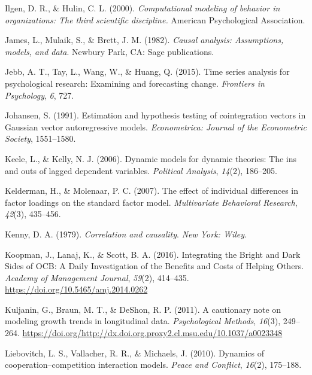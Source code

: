 \documentclass[english,,man]{apa6}
\begin{document}
\leavevmode\hypertarget{ref-ilgen_computational_2000}{}%
Ilgen, D. R., \& Hulin, C. L. (2000). \emph{Computational modeling of behavior in organizations: The third scientific discipline.} American Psychological Association.

\leavevmode\hypertarget{ref-james1982causal}{}%
James, L., Mulaik, S., \& Brett, J. M. (1982). \emph{Causal analysis: Assumptions, models, and data}. Newbury Park, CA: Sage publications.

\leavevmode\hypertarget{ref-jebb_time_2015}{}%
Jebb, A. T., Tay, L., Wang, W., \& Huang, Q. (2015). Time series analysis for psychological research: Examining and forecasting change. \emph{Frontiers in Psychology}, \emph{6}, 727.

\leavevmode\hypertarget{ref-johansen_estimation_1991}{}%
Johansen, S. (1991). Estimation and hypothesis testing of cointegration vectors in Gaussian vector autoregressive models. \emph{Econometrica: Journal of the Econometric Society}, 1551--1580.

\leavevmode\hypertarget{ref-keele_dynamic_2006}{}%
Keele, L., \& Kelly, N. J. (2006). Dynamic models for dynamic theories: The ins and outs of lagged dependent variables. \emph{Political Analysis}, \emph{14}(2), 186--205.

\leavevmode\hypertarget{ref-kelderman2007effect}{}%
Kelderman, H., \& Molenaar, P. C. (2007). The effect of individual differences in factor loadings on the standard factor model. \emph{Multivariate Behavioral Research}, \emph{42}(3), 435--456.

\leavevmode\hypertarget{ref-kenny1979correlation}{}%
Kenny, D. A. (1979). \emph{Correlation and causality}. \emph{New York: Wiley}.

\leavevmode\hypertarget{ref-koopman_integrating_2016}{}%
Koopman, J., Lanaj, K., \& Scott, B. A. (2016). Integrating the Bright and Dark Sides of OCB: A Daily Investigation of the Benefits and Costs of Helping Others. \emph{Academy of Management Journal}, \emph{59}(2), 414--435. \url{https://doi.org/10.5465/amj.2014.0262}

\leavevmode\hypertarget{ref-kuljanin_cautionary_2011}{}%
Kuljanin, G., Braun, M. T., \& DeShon, R. P. (2011). A cautionary note on modeling growth trends in longitudinal data. \emph{Psychological Methods}, \emph{16}(3), 249--264. \url{https://doi.org/http://dx.doi.org.proxy2.cl.msu.edu/10.1037/a0023348}

\leavevmode\hypertarget{ref-liebovitch2010dynamics}{}%
Liebovitch, L. S., Vallacher, R. R., \& Michaels, J. (2010). Dynamics of cooperation--competition interaction models. \emph{Peace and Conflict}, \emph{16}(2), 175--188.
\end{document}
